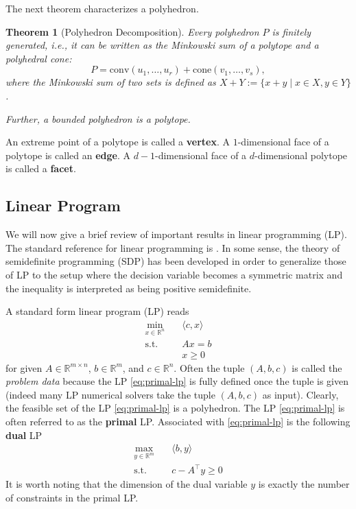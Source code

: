 \documentclass[
]{book}
\newtheorem{theorem}{Theorem}[chapter]
\theoremstyle{definition}
\theoremstyle{definition}
\theoremstyle{definition}
\theoremstyle{definition}
\theoremstyle{remark}
\begin{document}
The next theorem characterizes a polyhedron.

\begin{theorem}[Polyhedron Decomposition]
\protect\hypertarget{thm:DecomposePolyhedron}{}\label{thm:DecomposePolyhedron}Every polyhedron \(P\) is finitely generated, i.e., it can be written as the Minkowski sum of a polytope and a polyhedral cone:
\[
P = \mathrm{conv}(u_1,\dots,u_r) + \mathrm{cone}(v_1,\dots,v_s),
\]
where the Minkowski sum of two sets is defined as \(X + Y := \{ x+y \mid x \in X, y \in Y \}\).

Further, a bounded polyhedron is a polytope.
\end{theorem}

An extreme point of a polytope is called a \textbf{vertex}. A \(1\)-dimensional face of a polytope is called an \textbf{edge}. A \(d-1\)-dimensional face of a \(d\)-dimensional polytope is called a \textbf{facet}.

\hypertarget{linear-program}{%
\subsection{Linear Program}\label{linear-program}}

We will now give a brief review of important results in linear programming (LP). The standard reference for linear programming is \citep{bertsimas97book-lp}. In some sense, the theory of semidefinite programming (SDP) has been developed in order to generalize those of LP to the setup where the decision variable becomes a symmetric matrix and the inequality is interpreted as being positive semidefinite.

A standard form linear program (LP) reads
\begin{equation}
\begin{split}
\min_{x \in \mathbb{R}^{n}} & \quad \langle c, x \rangle  \\
\mathrm{s.t.}& \quad Ax = b \\
& \quad x \geq 0
\end{split}
\label{eq:primal-lp}
\end{equation}
for given \(A \in \mathbb{R}^{m\times n}\), \(b \in \mathbb{R}^{m}\), and \(c \in \mathbb{R}^{n}\). Often the tuple \((A,b,c)\) is called the \emph{problem data} because the LP \eqref{eq:primal-lp} is fully defined once the tuple is given (indeed many LP numerical solvers take the tuple \((A,b,c)\) as input). Clearly, the feasible set of the LP \eqref{eq:primal-lp} is a polyhedron. The LP \eqref{eq:primal-lp} is often referred to as the \textbf{primal} LP. Associated with \eqref{eq:primal-lp} is the following \textbf{dual} LP
\begin{equation}
\begin{split}
\max_{y \in \mathbb{R}^{m}} & \quad \langle b, y \rangle \\
\mathrm{s.t.}& \quad c - A^\top y \geq 0
\end{split}
\label{eq:dual-lp}
\end{equation}
It is worth noting that the dimension of the dual variable \(y\) is exactly the number of constraints in the primal LP.
\end{document}
